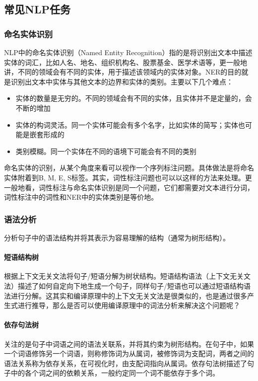 \subsection{常见NLP任务}

\subsubsection{命名实体识别}
NLP中的命名实体识别（Named Entity Recognition）指的是将识别出文本中描述实体的词汇，比如人名、地名、组织机构名、股票基金、医学术语等，更一般地讲，不同的领域会有不同的实体，用于描述该领域内的实体对象。NER的目的就是识别出文本中实体与其他文本的边界和实体的类别。主要以下几个难点：
\begin{itemize}
	\item 实体的数量是无穷的。不同的领域会有不同的实体，且实体并不是定量的，会不断的增加
	\item 实体的构词灵活。同一个实体可能会有多个名字，比如实体的简写；实体也可能是嵌套形成的
	\item 类别模糊。同一个实体在不同的语境下可能会有不同的类别
\end{itemize}

命名实体的识别，从某个角度来看可以视作一个序列标注问题。具体做法是将命名实体附着到{B, M, E, S}标签。其实，词性标注问题也可以以这样的方法来处理。更一般地看，词性标注与命名实体识别是同一个问题，它们都需要对文本进行分词，词性标注中的词性和NER中的实体类别是等价地。

\subsubsection{语法分析}
分析句子中的语法结构并将其表示为容易理解的结构（通常为树形结构）。
\paragraph{短语结构树}根据上下文无关文法将句子/短语分解为树状结构。短语结构语法（上下文无关文法）描述了如何自定向下地生成一个句子，同样句子/短语也可以通过短语结构语法进行分解。这其实和编译原理中的上下文无关文法是很类似的，也是通过很多产生式进行推导，那么是否可以使用编译原理中的词法分析来解决这个问题呢？

\paragraph{依存句法树}关注的是句子中词语之间的语法关联系，并将其约束为树形结构。在句子中，如果一个词语修饰另一个词语，则称修饰词为从属词，被修饰词为支配词，两者之间的语法关系称为依存关系，在可视化时，由支配词指向从属词。依存句法树描述了句子中的各个词之间的依赖关系，一般约定同一个词不能依存于多个词。

